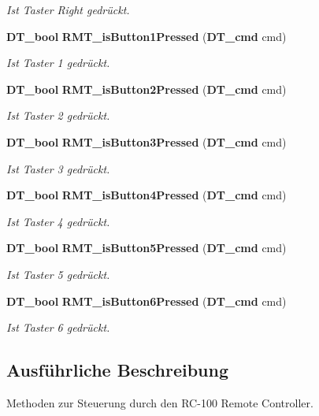 \begin{DoxyCompactItemize}
\begin{DoxyCompactList}\small\item\em Ist Taster Right gedrückt. \item\end{DoxyCompactList}\item 
{\bf DT\_\-bool} {\bf RMT\_\-isButton1Pressed} ({\bf DT\_\-cmd} cmd)
\begin{DoxyCompactList}\small\item\em Ist Taster 1 gedrückt. \item\end{DoxyCompactList}\item 
{\bf DT\_\-bool} {\bf RMT\_\-isButton2Pressed} ({\bf DT\_\-cmd} cmd)
\begin{DoxyCompactList}\small\item\em Ist Taster 2 gedrückt. \item\end{DoxyCompactList}\item 
{\bf DT\_\-bool} {\bf RMT\_\-isButton3Pressed} ({\bf DT\_\-cmd} cmd)
\begin{DoxyCompactList}\small\item\em Ist Taster 3 gedrückt. \item\end{DoxyCompactList}\item 
{\bf DT\_\-bool} {\bf RMT\_\-isButton4Pressed} ({\bf DT\_\-cmd} cmd)
\begin{DoxyCompactList}\small\item\em Ist Taster 4 gedrückt. \item\end{DoxyCompactList}\item 
{\bf DT\_\-bool} {\bf RMT\_\-isButton5Pressed} ({\bf DT\_\-cmd} cmd)
\begin{DoxyCompactList}\small\item\em Ist Taster 5 gedrückt. \item\end{DoxyCompactList}\item 
{\bf DT\_\-bool} {\bf RMT\_\-isButton6Pressed} ({\bf DT\_\-cmd} cmd)
\begin{DoxyCompactList}\small\item\em Ist Taster 6 gedrückt. \item\end{DoxyCompactList}\end{DoxyCompactItemize}


\subsection{Ausführliche Beschreibung}
Methoden zur Steuerung durch den RC-\/100 Remote Controller. 

